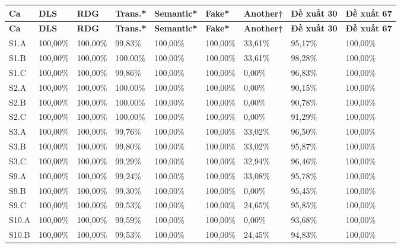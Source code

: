 \documentclass[10pt,a4paper]{article}
\begin{document}
\begingroup\small
\begin{longtable}{@{}P{1.269cm}P{1.450cm}P{1.450cm}P{1.722cm}P{1.812cm}P{1.540cm}P{1.722cm}P{1.993cm}P{1.993cm}@{}}
\toprule
\textbf{Ca} & \textbf{DLS} & \textbf{RDG} & \textbf{Trans.*} & \textbf{Semantic*} & \textbf{Fake*} & \textbf{Another†} & \textbf{Đề xuất 30} & \textbf{Đề xuất 67}\\\midrule
\endfirsthead
\toprule
\textbf{Ca} & \textbf{DLS} & \textbf{RDG} & \textbf{Trans.*} & \textbf{Semantic*} & \textbf{Fake*} & \textbf{Another†} & \textbf{Đề xuất 30} & \textbf{Đề xuất 67}\\\midrule
\endhead
\bottomrule\endfoot
S1.A & 100,00\% & 100,00\% & 99,83\% & 100,00\% & 100,00\% & 33,61\% & 95,17\% & 100,00\%\\
\addlinespace[3pt]
S1.B & 100,00\% & 100,00\% & 100,00\% & 100,00\% & 100,00\% & 33,61\% & 98,28\% & 100,00\%\\
\addlinespace[3pt]
S1.C & 100,00\% & 100,00\% & 99,86\% & 100,00\% & 100,00\% & 0,00\% & 96,83\% & 100,00\%\\
\addlinespace[3pt]
S2.A & 100,00\% & 100,00\% & 100,00\% & 100,00\% & 100,00\% & 0,00\% & 90,15\% & 100,00\%\\
\addlinespace[3pt]
S2.B & 100,00\% & 100,00\% & 100,00\% & 100,00\% & 100,00\% & 0,00\% & 90,78\% & 100,00\%\\
\addlinespace[3pt]
S2.C & 100,00\% & 100,00\% & 100,00\% & 100,00\% & 100,00\% & 0,00\% & 91,29\% & 100,00\%\\
\addlinespace[3pt]
S3.A & 100,00\% & 100,00\% & 99,76\% & 100,00\% & 100,00\% & 33,02\% & 96,50\% & 100,00\%\\
\addlinespace[3pt]
S3.B & 100,00\% & 100,00\% & 99,80\% & 100,00\% & 100,00\% & 33,02\% & 95,87\% & 100,00\%\\
\addlinespace[3pt]
S3.C & 100,00\% & 100,00\% & 99,29\% & 100,00\% & 100,00\% & 32,94\% & 96,46\% & 100,00\%\\
\addlinespace[3pt]
S9.A & 100,00\% & 100,00\% & 99,24\% & 100,00\% & 100,00\% & 33,08\% & 95,78\% & 100,00\%\\
\addlinespace[3pt]
S9.B & 100,00\% & 100,00\% & 99,30\% & 100,00\% & 100,00\% & 0,00\% & 95,45\% & 100,00\%\\
\addlinespace[3pt]
S9.C & 100,00\% & 100,00\% & 99,53\% & 100,00\% & 100,00\% & 24,65\% & 95,85\% & 100,00\%\\
\addlinespace[3pt]
S10.A & 100,00\% & 100,00\% & 99,59\% & 100,00\% & 100,00\% & 0,00\% & 93,68\% & 100,00\%\\
\addlinespace[3pt]
S10.B & 100,00\% & 100,00\% & 99,53\% & 100,00\% & 100,00\% & 24,45\% & 94,83\% & 100,00\%\\
\end{longtable}
\endgroup
\end{document}
